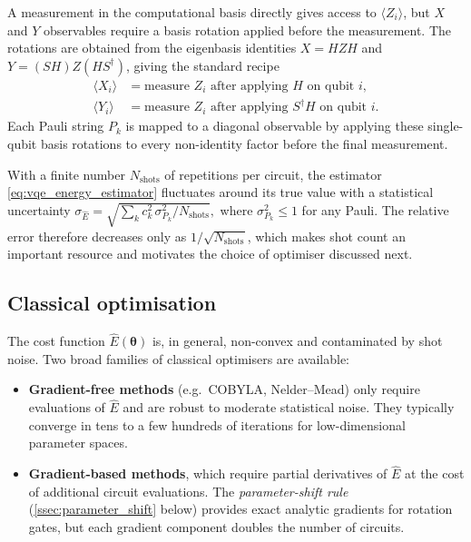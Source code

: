 A measurement in the computational basis directly gives access to
$\langle Z_i\rangle$, but $X$ and $Y$ observables require a basis rotation
applied before the measurement. The rotations are obtained from the
eigenbasis identities $X = H Z H$ and $Y = (S H) Z (H S^{\dagger})$, giving
the standard recipe
\begin{align}
  \label{eq:basis_rotations}
  \langle X_i\rangle &=
    \text{measure }Z_i \text{ after applying } H \text{ on qubit } i,\\[2pt]
  \langle Y_i\rangle &=
    \text{measure }Z_i \text{ after applying } S^{\dagger} H \text{ on qubit } i.
\end{align}
Each Pauli string $P_k$ is mapped to a diagonal observable by applying
these single-qubit basis rotations to every non-identity factor before the
final measurement.

\begin{remark}
With a finite number $N_{\mathrm{shots}}$ of repetitions per circuit, the
estimator \cref{eq:vqe_energy_estimator} fluctuates around its true value
with a statistical uncertainty
\(
  \sigma_{\widehat{E}}
  = \sqrt{\sum_k c_k^{2}\,\sigma_{P_k}^{2} / N_{\mathrm{shots}}},
\)
where $\sigma_{P_k}^{2} \leq 1$ for any Pauli. The relative error therefore
decreases only as $1/\sqrt{N_{\mathrm{shots}}}$, which makes shot count an
important resource and motivates the choice of optimiser discussed next.
\end{remark}

\subsection{Classical optimisation}
\label{ssec:vqe_optimisation}

The cost function $\widehat{E}(\bm{\theta})$ is, in general, non-convex and
contaminated by shot noise. Two broad families of classical optimisers are
available:

\begin{itemize}\setlength{\itemsep}{2pt}
  \item \textbf{Gradient-free methods} (e.g.\ COBYLA, Nelder--Mead) only
    require evaluations of $\widehat{E}$ and are robust to moderate
    statistical noise. They typically converge in tens to a few hundreds of
    iterations for low-dimensional parameter spaces.
  \item \textbf{Gradient-based methods}, which require partial derivatives
    of $\widehat{E}$ at the cost of additional circuit evaluations. The
    \emph{parameter-shift rule} (\cref{ssec:parameter_shift} below)
    provides exact analytic gradients for rotation gates, but each gradient
    component doubles the number of circuits.
\end{itemize}

